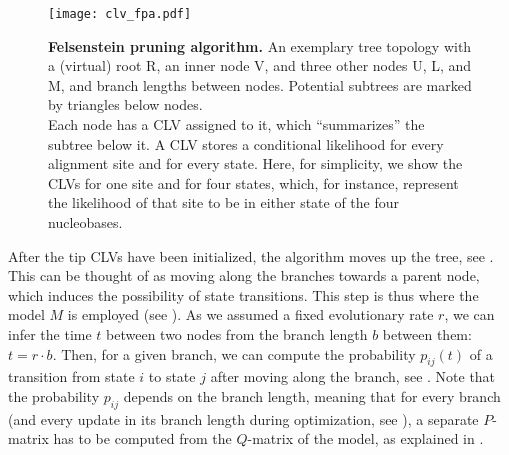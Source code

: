 \begin{figure}[pthb]
    \centering
    \texttt{[image: clv\_fpa.pdf]}
    \caption[Felsenstein pruning algorithm]{
        \textbf{Felsenstein pruning algorithm.}
        An exemplary tree topology with a (virtual) root {\sffamily R}, an inner node {\sffamily V},
        and three other nodes {\sffamily U}, {\sffamily L}, and {\sffamily M},
        and branch lengths between nodes.
        Potential subtrees are marked by triangles below nodes.
        \\
        Each node has a CLV assigned to it, which ``summarizes'' the subtree below it.
        A CLV stores a conditional likelihood for every alignment site and for every state.
        Here, for simplicity, we show the CLVs for one site and for four states,
        which, for instance, represent the likelihood of that site to be in either state of the four nucleobases.
    }
    \label{fig:clv_fpa}
\end{figure}

After the tip CLVs have been initialized, the algorithm moves up the tree, see .
This can be thought of as moving along the branches towards a parent node,
which induces the possibility of state transitions.
This step is thus where the model $M$ is employed (see ).
As we assumed a fixed evolutionary rate $r$,
we can infer the time $t$ between two nodes from the branch length $b$ between them: $t = r \cdot b$.
Then, for a given branch, we can compute the probability $p_{ij}(t)$ of a transition
from state $i$ to state $j$ after moving along the branch, see .
Note that the probability $p_{ij}$ depends on the branch length,
meaning that for every branch (and every update in its branch length during optimization,
see ),
a separate $P$-matrix has to be computed from the $Q$-matrix of the model,
as explained in .

